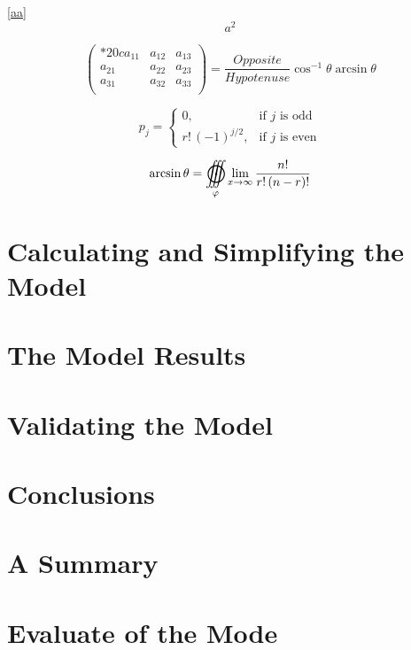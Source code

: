 \documentclass{mcmthesis}
\begin{document}
\lipsum[8] \eqref{aa}
\begin{equation}
a^2 \label{aa}
\end{equation}

\[
  \begin{pmatrix}{*{20}c}
  {a_{11} } & {a_{12} } & {a_{13} }  \\
  {a_{21} } & {a_{22} } & {a_{23} }  \\
  {a_{31} } & {a_{32} } & {a_{33} }  \\
  \end{pmatrix}
  = \frac{{Opposite}}{{Hypotenuse}}\cos ^{ - 1} \theta \arcsin \theta
\]
\lipsum[9]

\[
  p_{j}=\begin{cases} 0,&\text{if $j$ is odd}\\
  r!\,(-1)^{j/2},&\text{if $j$ is even}
  \end{cases}
\]

\lipsum[10]

\[
  \arcsin \theta  =
  \mathop{{\int\!\!\!\!\!\int\!\!\!\!\!\int}\mkern-31.2mu
  \bigodot}\limits_\varphi
  {\mathop {\lim }\limits_{x \to \infty } \frac{{n!}}{{r!\left( {n - r}
  \right)!}}} 
\]

\section{Calculating and Simplifying the Model  }
\lipsum[11]

\section{The Model Results}
\lipsum[6]

\section{Validating the Model}
\lipsum[9]

\section{Conclusions}
\lipsum[6]

\section{A Summary}
\lipsum[6]

\section{Evaluate of the Mode}
\end{document}
